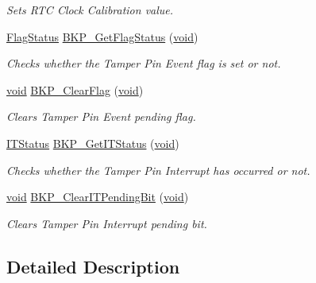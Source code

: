 \begin{DoxyCompactItemize}
\begin{DoxyCompactList}\small\item\em Sets R\+TC Clock Calibration value. \end{DoxyCompactList}\item 
\hyperlink{agilefox_2library_2inc_2stm32f10x__type_8h_a89136caac2e14c55151f527ac02daaff}{Flag\+Status} \hyperlink{group___b_k_p___exported___functions_gacc9aedde760383f0bd146f0d77a547db}{B\+K\+P\+\_\+\+Get\+Flag\+Status} (\hyperlink{usb__devapi_8h_afabf60e7f57651d6d595a02c75f07cd0}{void})
\begin{DoxyCompactList}\small\item\em Checks whether the Tamper Pin Event flag is set or not. \end{DoxyCompactList}\item 
\hyperlink{usb__devapi_8h_afabf60e7f57651d6d595a02c75f07cd0}{void} \hyperlink{group___b_k_p___exported___functions_ga3f3aea5b0a3d8d5d79b0b506928351ea}{B\+K\+P\+\_\+\+Clear\+Flag} (\hyperlink{usb__devapi_8h_afabf60e7f57651d6d595a02c75f07cd0}{void})
\begin{DoxyCompactList}\small\item\em Clears Tamper Pin Event pending flag. \end{DoxyCompactList}\item 
\hyperlink{agilefox_2library_2inc_2stm32f10x__type_8h_aacbd7ed539db0aacd973a0f6eca34074}{I\+T\+Status} \hyperlink{group___b_k_p___exported___functions_ga99566c9f1f17f499020606cb63511494}{B\+K\+P\+\_\+\+Get\+I\+T\+Status} (\hyperlink{usb__devapi_8h_afabf60e7f57651d6d595a02c75f07cd0}{void})
\begin{DoxyCompactList}\small\item\em Checks whether the Tamper Pin Interrupt has occurred or not. \end{DoxyCompactList}\item 
\hyperlink{usb__devapi_8h_afabf60e7f57651d6d595a02c75f07cd0}{void} \hyperlink{group___b_k_p___exported___functions_ga6a93ef8e40959bb10fea670e2040ad74}{B\+K\+P\+\_\+\+Clear\+I\+T\+Pending\+Bit} (\hyperlink{usb__devapi_8h_afabf60e7f57651d6d595a02c75f07cd0}{void})
\begin{DoxyCompactList}\small\item\em Clears Tamper Pin Interrupt pending bit. \end{DoxyCompactList}\end{DoxyCompactItemize}


\subsection{Detailed Description}


